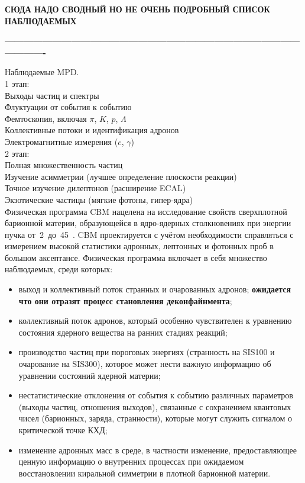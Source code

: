 


\textbf{СЮДА НАДО СВОДНЫЙ НО НЕ ОЧЕНЬ ПОДРОБНЫЙ СПИСОК НАБЛЮДАЕМЫХ}

\textbf{----------------------------------------------------------------------------------------------------------}

Наблюдаемые MPD. \\
1 этап: \\
Выходы частиц и спектры \\
Флуктуации от события к событию \\
Фемтоскопия, включая $\pi$, $K$, $p$, $\Lambda$ \\
Коллективные потоки и идентификация адронов \\
Электромагнитные измерения ($e$, $\gamma$) \\

2 этап: \\
Полная множественность частиц \\
Изучение асимметрии (лучшее определение плоскости реакции) \\
Точное изучение дилептонов (расширение ECAL) \\
Экзотические частицы (мягкие фотоны, гипер-ядра) \\


Физическая программа CBM нацелена на исследование свойств сверхплотной барионной материи, образующейся в ядро-ядерных столкновениях при энергии пучка от~2~до~45~\GeVperNucl. CBM проектируется с учётом необходимости справляться с измерением высокой статистики адронных, лептонных и фотонных проб в большом аксептансе. Физическая программа включает в себя множество наблюдаемых, среди которых:

\begin{itemize}
\item выход и коллективный поток странных и очарованных адронов; \todo \textbf{ожидается что они отразят процесс становления деконфайнмента};
\item коллективный поток адронов, который особенно чувствителен к уравнению состояния ядерного вещества на ранних стадиях реакций;
\item производство частиц при пороговых энергиях (странность на SIS100 и очарование на SIS300), которое может нести важную информацию об уравнении состояний ядерной материи;
\item нестатистические отклонения от события к событию различных параметров (выходы частиц, отношения выходов), связанные с сохранением квантовых чисел (барионных, заряда, странности), которые могут служить сигналом о критической точке КХД;
\item изменение адронных масс в среде, в частности изменение, предоставляющее ценную информацию о внутренних процессах при ожидаемом восстановлении киральной симметрии в плотной барионной материи.
\end{itemize}

